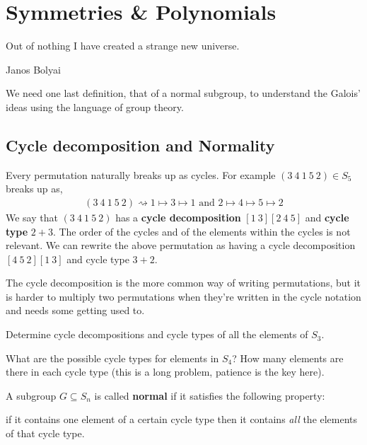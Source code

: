 \section{Symmetries \& Polynomials}

\epigraph{Out of nothing I have created a strange new universe.}{Janos Bolyai}



We need one last definition, that of a normal subgroup, to understand the Galois' ideas using the language of group theory. 

\subsection{Cycle decomposition and Normality}
Every permutation naturally breaks up as cycles. For example $ (3 \: 4 \: 1 \: 5 \: 2) \in S_5$ breaks up as,
\begin{align*}
  (3 \: 4 \: 1 \: 5 \: 2) \rightsquigarrow 1 \mapsto 3 \mapsto 1 \mbox{ and } 2 \mapsto 4 \mapsto 5 \mapsto 2 
\end{align*}
We say that $ (3 \: 4 \: 1 \: 5 \: 2)$ has a \textbf{cycle decomposition} $[1 \: 3] [2 \: 4 \: 5]$ and \textbf{cycle type} $2 + 3$. The order of the cycles and of the elements within the cycles is not relevant. We can rewrite the above permutation as having a cycle decomposition $[4 \: 5 \: 2][1 \: 3] $ and cycle type $3 + 2$. 

{The cycle decomposition is the more common way of writing permutations, but it is harder to multiply two permutations when they're written in the cycle notation and needs some getting used to.}

\begin{questions}
  \item Determine cycle decompositions and cycle types of all the elements of $ S_3$.
  \item 
  \label{ques:s4}
  What are the possible cycle types for elements in $ S_4$? How many elements are there in each cycle type (this is a long problem, patience is the key here).
\end{questions}

\noindent A subgroup $ G \subseteq S_n$ is called \textbf{normal} if it satisfies the following property:
 
if it contains one element of a certain cycle type then it contains \emph{all} the elements of that cycle type.



